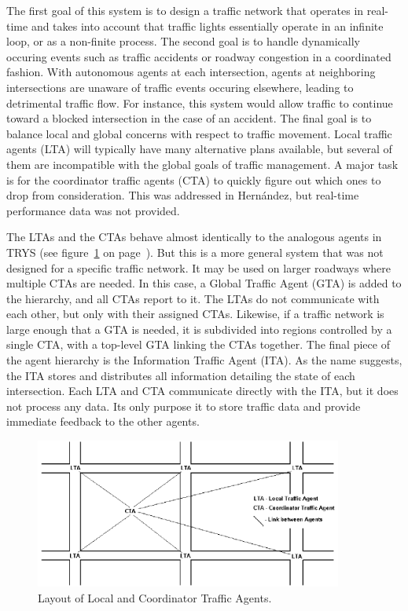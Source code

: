 \documentclass[11pt,letterpaper,onecolumn,twoside,openright,final]{report}
\begin{document}
The first goal of this system is to design a traffic network that operates in real-time and takes into account that traffic lights essentially operate in an infinite loop, or as a non-finite process.
The second goal is to handle dynamically occuring events such as traffic accidents or roadway congestion in a coordinated fashion.
With autonomous agents at each intersection, agents at neighboring intersections are unaware of traffic events occuring elsewhere, leading to detrimental traffic flow.
For instance, this system would allow traffic to continue toward a blocked intersection in the case of an accident.
The final goal is to balance local and global concerns with respect to traffic movement.
Local traffic agents (LTA) will typically have many alternative plans available, but several of them are incompatible with the global goals of traffic management.
A major task is for the coordinator traffic agents (CTA) to quickly figure out which ones to drop from consideration.
This was addressed in Hern\'{a}ndez, but real-time performance data was not provided.

The LTAs and the CTAs behave almost identically to the analogous agents in TRYS (see figure~\ref{fig:LTAs-and-CTA} on page~\pageref{fig:LTAs-and-CTA}).
But this is a more general system that was not designed for a specific traffic network.
It may be used on larger roadways where multiple CTAs are needed.
In this case, a Global Traffic Agent (GTA) is added to the hierarchy, and all CTAs report to it.
The LTAs do not communicate with each other, but only with their assigned CTAs.
Likewise, if a traffic network is large enough that a GTA is needed, it is subdivided into regions controlled by a single CTA, with a top-level GTA linking the CTAs together.
The final piece of the agent hierarchy is the Information Traffic Agent (ITA).
As the name suggests, the ITA stores and distributes all information detailing the state of each intersection.
Each LTA and CTA communicate directly with the ITA, but it does not process any data.
Its only purpose it to store traffic data and provide immediate feedback to the other agents.

\begin{figure}[h]
  \includegraphics[width=0.9\textwidth]{figures/LTAs-and-CTA.PNG}
  \caption{Layout of Local and Coordinator Traffic Agents.}
  \label{fig:LTAs-and-CTA}
\end{figure}
\end{document}
